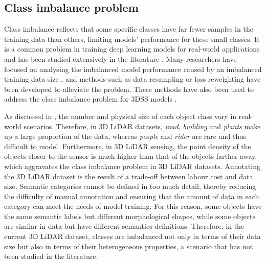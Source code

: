 \documentclass[journal]{IEEEtran}
\begin{document}
\subsection{Class imbalance problem}
Class imbalance reflects that some specific classes have far fewer samples in the training data than others, limiting models' performance for these small classes.
It is a common problem in training deep learning models for real-world applications and has been studied extensively in the literature \cite{johnson2019survey}\cite{zhang2021deep}. 
Many researchers have focused on analysing the imbalanced model performance caused by an imbalanced training data size \cite{hensman2015impact}\cite{buda2018systematic} \cite{ghosh2021combined}, and methods such as data resampling \cite{menardi2014training}\cite{pouyanfar2018dynamic} or loss reweighting \cite{lin2017focal}\cite{cui2019class} have been developed to alleviate the problem. These methods have also been used to address the class imbalance problem for 3DSS models \cite{chen2020compositional}.

As discussed in \cite{gao2021we}, the number and physical size of each object class vary in real-world scenarios. Therefore, in 3D LiDAR datasets, \textit{road}, \textit{building} and \textit{plants} make up a large proportion of the data, whereas \textit{people} and \textit{rider} are rare and thus difficult to model. Furthermore, in 3D LiDAR sensing, the point density of the objects closer to the sensor is much higher than that of the objects farther away, which aggravates the class imbalance problem in 3D LiDAR datasets.
Annotating the 3D LiDAR dataset is the result of a trade-off between labour cost and data size. Semantic categories cannot be defined in too much detail, thereby reducing the difficulty of manual annotation and ensuring that the amount of data in each category can meet the needs of model training.
For this reason, some objects have the same semantic labels but different morphological shapes, while some objects are similar in data but have different semantics definitions.
Therefore, in the current 3D LiDAR dataset, classes are imbalanced not only in terms of their data size but also in terms of their heterogeneous properties, a scenario that has not been studied in the literature.
\end{document}
